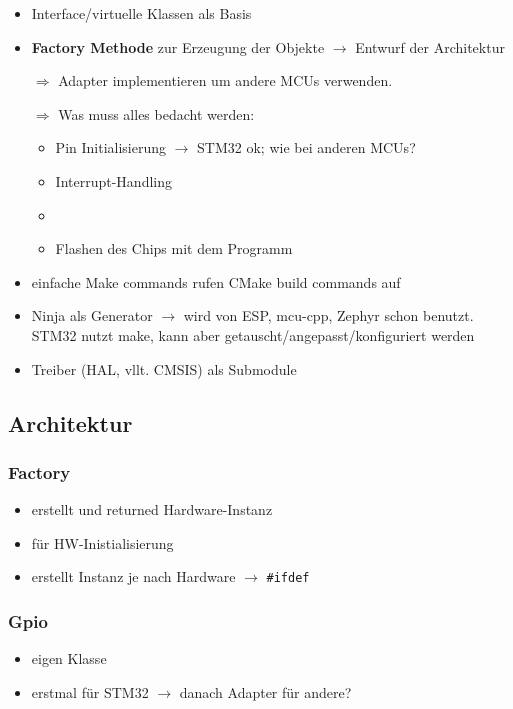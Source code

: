 \begin{itemize}
	\item Interface/virtuelle Klassen als Basis
	\item \textbf{Factory Methode} zur Erzeugung der Objekte $\rightarrow$ Entwurf der Architektur
	\item [$\Rightarrow$] Adapter implementieren um andere MCUs verwenden.
	\item [$\Rightarrow$] Was muss alles bedacht werden:
	\begin{itemize}
		\item Pin Initialisierung $\rightarrow$ STM32 ok; wie bei anderen MCUs?
		\item Interrupt-Handling
		\item 
		\item Flashen des Chips mit dem Programm
	\end{itemize}
	\item einfache Make commands rufen CMake build commands auf
	\item Ninja als Generator $\rightarrow$ wird von ESP, mcu-cpp, Zephyr schon benutzt. STM32 nutzt make, kann aber getauscht/angepasst/konfiguriert werden
	\item Treiber (HAL, vllt. CMSIS) als Submodule
\end{itemize}

\subsection{Architektur}
\subsubsection*{Factory}
\begin{itemize}
	\item erstellt und returned Hardware-Instanz
	\item für HW-Inistialisierung
	\item erstellt Instanz je nach Hardware $\rightarrow$ \texttt{\#ifdef}
\end{itemize}

\subsubsection*{Gpio}
\begin{itemize}
	\item eigen Klasse
	\item erstmal für STM32 $\rightarrow$ danach Adapter für andere?
\end{itemize}

